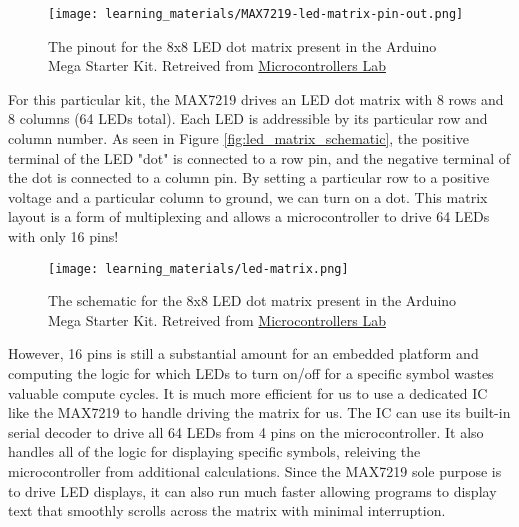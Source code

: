     \begin{figure}[h!]
        \texttt{[image: learning\_materials/MAX7219-led-matrix-pin-out.png]}
        \caption[LED Matrix Pinout]{The pinout for the 8x8 LED dot matrix present in the Arduino Mega Starter Kit. 
        Retreived from \href{https://microcontrollerslab.com/wp-content/uploads/2021/09/MAX7219-led-matrix-pin-out.jpg?ezimgfmt=ng:webp/ngcb1}{Microcontrollers Lab}}
    \end{figure}


    For this particular kit, the MAX7219 drives an LED dot matrix with 8 rows and 8 columns (64 LEDs total). 
    Each LED is addressible by its particular row and column number.
    As seen in Figure \ref{fig:led_matrix_schematic}, the positive terminal of the LED "dot" is connected to a row pin, and the negative terminal of the dot is connected to a column pin.
    By setting a particular row to a positive voltage and a particular column to ground, we can turn on a dot.
    This matrix layout is a form of multiplexing and allows a microcontroller to drive 64 LEDs with only 16 pins!

    \begin{figure}[b!]
        \texttt{[image: learning\_materials/led-matrix.png]}
        \caption[LED Matrix Schematic]{The schematic for the 8x8 LED dot matrix present in the Arduino Mega Starter Kit. 
        Retreived from \href{https://microcontrollerslab.com/wp-content/uploads/2016/11/led-matrix.jpg?ezimgfmt=ng:webp/ngcb1}{Microcontrollers Lab}}
    \end{figure}

    However, 16 pins is still a substantial amount for an embedded platform and computing the logic for which LEDs to turn on/off for a specific symbol wastes valuable compute cycles.
    It is much more efficient for us to use a dedicated IC like the MAX7219 to handle driving the matrix for us. 
    The IC can use its built-in serial decoder to drive all 64 LEDs from 4 pins on the microcontroller.
    It also handles all of the logic for displaying specific symbols, releiving the microcontroller from additional calculations.
    Since the MAX7219 sole purpose is to drive LED displays, it can also run much faster allowing programs to display text that smoothly scrolls across the matrix with minimal interruption.
    
